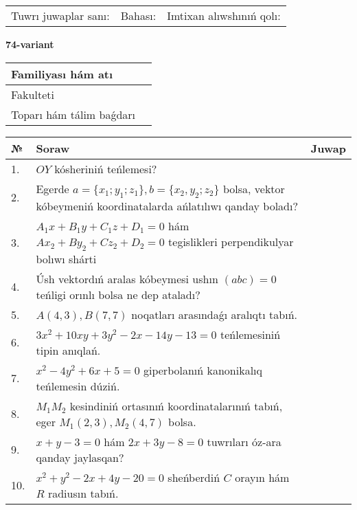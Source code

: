 \documentclass{article}
\begin{document}
\vspace{1cm}

\begin{tabular}{lll}
Tuwrı juwaplar sanı: \underline{\hspace{1.5cm}} & 
Bahası: \underline{\hspace{1.5cm}} & 
Imtixan alıwshınıń qolı: \underline{\hspace{2cm}} \\
\end{tabular}

\egroup

\newpage


\textbf{74-variant}\\

\bgroup
\def\arraystretch{1.6} %

\begin{tabular}{|m{5.7cm}|m{9.5cm}|}
\hline
Familiyası hám atı & \\
\hline
Fakulteti  & \\
\hline
Toparı hám tálim baǵdarı  & \\
\hline
\end{tabular}

\vspace{1cm}

\begin{tabular}{|m{0.7cm}|m{10cm}|m{4cm}|}
\hline
№ & Soraw & Juwap \\
\hline
1. & $OY$ kósheriniń teńlemesi? &  \\
\hline
2. & Egerde $a=\{ x_1; y_1; z_1\}, b=\{ x_2, y_2; z_2\}$ bolsa, vektor kóbeymeniń koordinatalarda ańlatılıwı qanday boladı? &  \\
\hline
3. & $A_1x+B_1y+C_1z+D_1=0$ hám $Ax_2+By_2+Cz_2+D_2=0$ tegislikleri perpendikulyar bolıwı shárti &  \\
\hline
4. & Úsh vektordıń aralas kóbeymesi ushın $(abc)=0$ teńligi orınlı bolsa ne dep ataladı? &  \\
\hline
5. & $A(4, 3), B(7, 7)$ noqatları arasındaǵı aralıqtı tabıń. &  \\
\hline
6. & $3x^{2}+10xy+3y^{2}-2x-14y-13=0$ teńlemesiniń tipin anıqlań. &  \\
\hline
7. & $x^{2}-4y^{2}+6x+5=0$ giperbolanıń kanonikalıq teńlemesin dúziń. &  \\
\hline
8. & $M_{1}M_{2}$ kesindiniń ortasınıń koordinatalarınıń tabıń, eger $M_{1} (2, 3), M_{2} (4, 7)$ bolsa. &  \\
\hline
9. & $x+y-3=0$ hám $2x+3y-8=0$ tuwrıları óz-ara qanday jaylasqan? &  \\
\hline
10. & $x^{2}+y^{2}-2x+4y-20=0$ sheńberdiń $C$ orayın hám $R$ radiusın tabıń. &  \\
\hline
\end{tabular}
\end{document}
